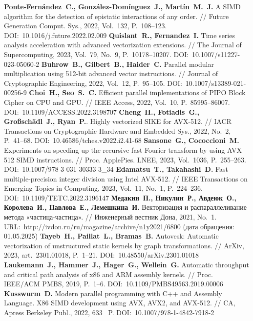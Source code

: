 \begin{thebibliography}{99}
\textbf{Ponte-Fern{\'a}ndez~C., Gonz{\'a}lez-Dom{\'i}nguez~J., Mart{\'i}n~M.~J.} A SIMD algorithm for the detection of epistatic interactions of any order. // Future Generation Comput. Sys., 2022, Vol.~132, P.~108–123. DOI:~10.1016/j.future.2022.02.009
\textbf{Quislant~R., Fernandez~I.} Time series analysis acceleration with advanced vectorization extensions. // The Journal of Supercomputing, 2023, Vol.~79, No.~9, P.~10178–10207. DOI:~10.1007/s11227-023-05060-2
\textbf{Buhrow~B., Gilbert~B., Haider~C.} Parallel modular multiplication using 512-bit advanced vector instructions. // Journal of Cryptographic Engineering, 2022, Vol.~12, P.~95–105. DOI:~10.1007/s13389-021-00256-9
\textbf{Choi~H., Seo~S.~C.} Efficient parallel implementations of PIPO Block Cipher on CPU and GPU. // IEEE Access, 2022, Vol.~10, P.~85995–86007. DOI:~10.1109/ACCESS.2022.3198707
\textbf{Cheng~H., Fotiadis~G., Gro{\ss}sch{\"a}dl~J., Ryan~P.}. Highly vectorized SIKE for AVX-512. // IACR Transactions on Cryptographic Hardware and Embedded Sys., 2022, No.~2, P.~41–68. DOI:~10.46586/tches.v2022.i2.41-68
\textbf{Sansone~G., Cococcioni~M.} Experiments on speeding up the recursive fast Fourier transform by using AVX-512 SIMD instructions. // Proc. ApplePies. LNEE, 2023, Vol.~1036, P.~255–263. DOI:~10.1007/978-3-031-30333-3\_34
\textbf{Edamatsu~T., Takahashi~D.} Fast multiple-precision integer division using Intel AVX-512. // IEEE Transactions on Emerging Topics in Computing, 2023, Vol.~11, No.~1, P.~224–236. DOI:~10.1109/TETC.2022.3196147
\textbf{Медакин~П., Никулин~Р., Авдеюк~О., Королева~И., Павлова~Е., Лемешкина~И.} Векторизация и распараллеливание метода «частица-частица». // Инженерный вестник Дона, 2021, No.~1. URL:~http://ivdon.ru/ru/magazine/archive/n1y2021/6800 (дата обращения: 01.05.2025)
\textbf{Tayeb~H., Paillat~L., Bramas~B.} Autovesk: Automatic vectorization of unstructured static kernels by graph transformations. // ArXiv, 2023, art.~2301.01018, P.~1–21. DOI:~10.48550/arXiv.2301.01018
\textbf{Laukemann~J., Hammer~J., Hager~G., Wellein~G.} Automatic throughput and critical path analysis of x86 and ARM assembly kernels. // Proc. IEEE/ACM PMBS, 2019, P.~1–6. DOI:~10.1109/PMBS49563.2019.00006
\textbf{Kusswurm~D.} Modern parallel programming with C++ and Assembly Language. X86 SIMD development using AVX, AVX2, and AVX-512. // CA, Apress Berkeley Publ., 2022, 633~ P. DOI:~10.1007/978-1-4842-7918-2


\end{thebibliography}
